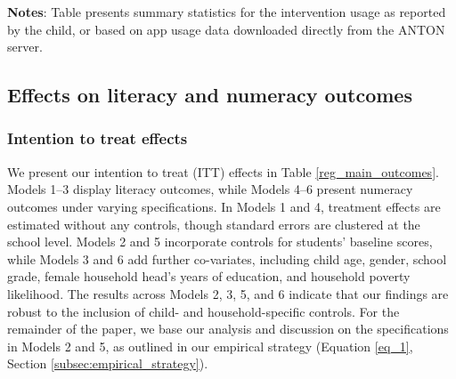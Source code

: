 \documentclass[hidelinks,12pt]{article}
\begin{document}
\begin{singlespace}
\begingroup
\setlength{\tabcolsep}{30pt}  %
\begin{table}[H]
   \begin{singlespace}
    \centering
    \fontsize{11pt}{10pt}\selectfont  %
    \begin{threeparttable}
            
        \begin{tablenotes}
             \small %
            \item \textbf{Notes}:  Table presents summary statistics for the intervention usage as reported by the child, or based on app usage data downloaded directly from the ANTON server.
        \end{tablenotes}
    \end{threeparttable}
    \end{singlespace}
\end{table}
\endgroup

\subsection{Effects on literacy and numeracy outcomes} %
\subsubsection{Intention to treat effects} %
We present our intention to treat (ITT) effects in Table \ref{reg_main_outcomes}. Models 1–3 display literacy outcomes, while Models 4–6 present numeracy outcomes under varying specifications. In Models 1 and 4, treatment effects are estimated without any controls, though standard errors are clustered at the school level. Models 2 and 5 incorporate controls for students' baseline scores, while Models 3 and 6 add further co-variates, including child age, gender, school grade, female household head’s years of education, and household poverty likelihood. The results across Models 2, 3, 5, and 6 indicate that our findings are robust to the inclusion of child- and household-specific controls. For the remainder of the paper, we base our analysis and discussion on the specifications in Models 2 and 5, as outlined in our empirical strategy (Equation \ref{eq_1}, Section \ref{subsec:empirical_strategy}). 


\end{singlespace}
\end{document}
